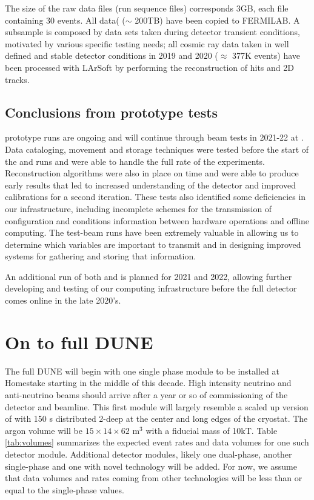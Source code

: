 The size of the raw data files (run sequence files) corresponds 3GB, each file containing 30 events. All data( ($\sim$ 200TB)  have been copied to FERMILAB. A subsample is composed by data sets taken during detector transient conditions, motivated by various specific testing needs;  all cosmic ray data taken in well defined and stable detector conditions in 2019 and 2020 ($\approx$  377K events) have been processed with LArSoft by performing the reconstruction of hits and 2D tracks. 

\subsection{Conclusions from prototype tests}
 prototype runs are ongoing and will continue through beam tests in 2021-22 at .  Data cataloging, movement and storage techniques were tested before the start of the  and   runs and were able to handle the full rate of the experiments.   Reconstruction algorithms were also in place on time and were able to produce early results that led to increased understanding of the detector and improved calibrations for a second iteration.  These tests also identified some deficiencies in our infrastructure, including incomplete schemes for the transmission of configuration and conditions information between hardware operations and  offline computing.  The test-beam runs have been extremely valuable in allowing us to determine which variables are important to transmit and in designing improved systems for gathering and storing that information. 

An additional run of both  and  is planned for 2021 and 2022, allowing further developing and testing of our computing infrastructure before the full detector comes online in the late 2020's. 


\section{On to full DUNE}

The full DUNE  will begin with one single phase module to be installed at Homestake starting in the middle of  this decade.  High intensity neutrino and anti-neutrino beams should arrive after a year or so of commissioning of the detector and  beamline.  This first module will largely resemble a scaled up version of  with 150 s distributed 2-deep at the center and long edges of the cryostat.   The argon volume will be $15\times14\times62$ m$^3$ with a fiducial mass of 10kT.  Table \ref{tab:volumes} summarizes the expected event rates and data volumes for one such detector module.  Additional detector modules, likely one dual-phase, another single-phase and  one with novel technology will be added.  For now, we assume that data volumes and rates coming from other technologies will be less than or equal to the single-phase values. 



